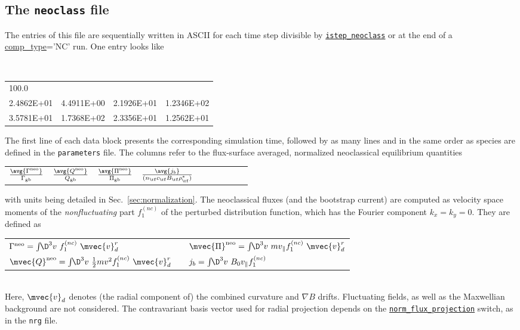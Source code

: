 \documentclass[12pt]{article}
\begin{document}
\subsection{The \texttt{neoclass} file}
\label{subsec:neoclass-file}
The entries of this file are sequentially written in ASCII for each time step divisible by
\hyperlink{istep_neoclass}{\tt istep\_neoclass} or at the end of a \hyperlink{comp_type}{\rm comp\_type}='NC' run.
One entry looks like
\begin{center}
\scriptsize \tt
\begin{tabular}{llll}
100.0 & & & \\
2.4862E+01 & 4.4911E+00 & 2.1926E+01 & 1.2346E+02 \\
3.5781E+01 & 1.7368E+02 & 2.3356E+01 & 1.2562E+01
\end{tabular}
\end{center}
The first line of each data block presents the corresponding simulation time,
followed by as many lines and in the same order as species are defined in
the {\tt parameters} file. The columns refer to the flux-surface averaged,
normalized neoclassical equilibrium quantities\\[-2ex]
\begin{center}
\begin{tabular}{*{10}{c}} %
$\frac{\avg{\Gamma^{\rm neo}}}{\Gamma_{\rm gb}}$ & $\frac{\avg{Q^{\rm neo}}}{Q_{\rm gb}}$ &
$\frac{{\avg{\Pi^{\rm neo}}}}{\Pi_{\rm gb}}$ & $\frac{{\avg{j_b}}}{(n_{\rf} c_{\rf} B_{\rf} \rho_\rf^*)}$ \\
\end{tabular}
\end{center}
with units being detailed in Sec.~\ref{sec:normalization}.
The neoclassical fluxes (and the bootstrap current) are computed as velocity space moments of the
{\em nonfluctuating} part $f_1^{(nc)}$ of the perturbed distribution function,
which has the Fourier component $k_x=k_y=0$. They are defined as\\[1ex]
\begin{tabular}{lp{3em}l}
$\Gamma^{\rm neo} = \int\!\!\D^3v\,\, f_1^{(nc)}\,\, \mvec{v}^r_d$ & &
$\mvec{\Pi}^{\rm neo} = \int\!\!\D^3v\,\, m v_{\|} f_1^{(nc)}\,\, \mvec{v}^r_d$ \\
$\mvec{Q}^{\rm neo} = \int\!\!\D^3v\,\, \frac{1}{2}m v^2 f_1^{(nc)}\,\, \mvec{v}^r_d$ & &
$j_{b} = \int\!\!\D^3v\,\,B_0v_\| f_1^{(nc)}$
\end{tabular}\\[1ex]
Here, $\mvec{v}_d$ denotes (the radial component of) the combined curvature and $\nabla B$ drifts.
Fluctuating fields, as well as the Maxwellian background are not
considered.
The contravariant basis vector used for radial projection depends on
the \hyperlink{norm_flux_projection}{\tt norm\_flux\_projection} switch, as in the {\tt nrg} file.
\end{document}
